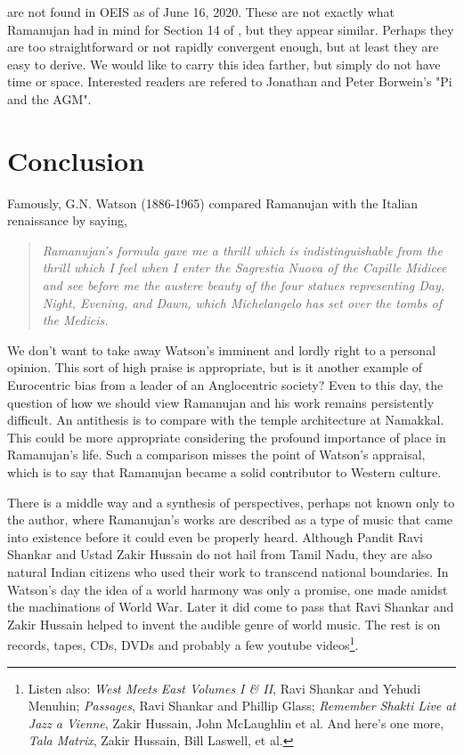 \documentclass[nofootinbib,preprint]{revtex4-1}
\begin{document}
are not found in OEIS as of June 16, 2020. These are not exactly what Ramanujan had in 
mind for Section 14 of \cite{RAMANUJAN1914}, but they appear similar. Perhaps they are too straightforward 
or not rapidly convergent enough, but at least they are easy to derive. We would like to carry 
this idea farther, but simply do not have time or space. Interested readers are refered to 
Jonathan and Peter Borwein's "Pi and the AGM"\cite{BORWEIN1987}.


\section{Conclusion}
Famously, G.N. Watson (1886-1965) compared Ramanujan with the Italian renaissance
by saying, 
\begin{quote}
\textit{Ramanujan's formula gave me a thrill which is indistinguishable from the thrill
which I feel when I enter the Sagrestia Nuova of the Capille Midicee and see 
before me the austere beauty of the four statues representing Day, Night, 
Evening, and Dawn, which Michelangelo has set over the tombs of the Medicis.} 
\end{quote}
We don't want to take away Watson's imminent and lordly right to a personal opinion. 
This sort of high praise is appropriate, but is it another example of 
Eurocentric bias from a leader of an Anglocentric society? Even to this day, 
the question of how we should view Ramanujan and his work remains persistently 
difficult. An antithesis is to compare with the temple architecture at Namakkal. This 
could be more appropriate considering the profound importance of place in Ramanujan's 
life. Such a comparison misses the point of Watson's appraisal, which is to 
say that Ramanujan became a solid contributor to Western culture.

There is a middle way and a synthesis of perspectives, perhaps not known only 
to the author, where Ramanujan's works are described as a type of music that 
came into existence before it could even be properly heard. Although Pandit 
Ravi Shankar and Ustad Zakir Hussain do not hail from Tamil Nadu, they are 
also natural Indian citizens who used their work to transcend national 
boundaries. In Watson's day the idea of a world harmony was 
only a promise, one made amidst the machinations of World War. Later it 
did come to pass that Ravi Shankar and Zakir Hussain helped to invent the 
audible genre of world music. The rest is on records, tapes, CDs, 
DVDs and probably a few youtube videos\footnote{Listen 
also: \textit{West Meets East Volumes I \& II}, 
Ravi Shankar and Yehudi Menuhin; \textit{Passages}, Ravi Shankar and 
Phillip Glass; \textit{Remember Shakti Live at Jazz a Vienne}, Zakir Hussain, 
John McLaughlin et al. And here's one more, 
\textit{Tala Matrix}, Zakir Hussain, Bill Laswell, et al.}.
\end{document}
